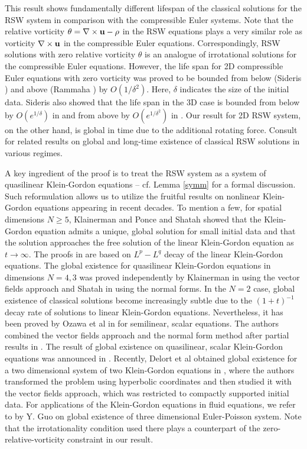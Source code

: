 \documentclass[12pt]{amsart}
\numberwithin{equation}{section} \numberwithin{theorem}{section}
\numberwithin{example}{section} \numberwithin{remark}{section}
\numberwithin{figure}{section} \numberwithin{algorithm}{section}
\def\vu{{\bf u}}
\begin{document}
This result shows fundamentally different lifespan of the classical
solutions for the RSW system in comparison with the compressible
Euler systems. Note that the relative vorticity $\theta=\nabla\times\vu-\rho$ in the RSW
equations plays a very similar role as vorticity $\nabla\times\vu$ in the compressible
Euler equations. Correspondingly, RSW solutions with zero relative
vorticity $\theta$ is an analogue of irrotational solutions for the
compressible Euler equations. However, the life span for 2D
compressible Euler equations with zero vorticity was proved to be
bounded from below (Sideris \cite{Sideris:2D}) and above (Rammaha
\cite{Rammaha}) by $O({1}/{\delta^2})$. Here, $\delta$ indicates the
size of the initial data. Sideris also showed that the life span in
the 3D case is bounded from below by $O(e^{1/\delta})$ in
\cite{Sideris:3D} and from above by $O(e^{1/{\delta^2}})$ in
\cite{Sideris:3D:singularity}. Our result for 2D RSW system, on the other hand, is global in time due to the additional rotating
force. Consult \cite{Babin, LiTa:rotation, ChTa:SIAM} for related results on global and long-time existence of classical RSW solutions in various regimes.

A key ingredient of the proof is to treat the RSW system as a system
of quasilinear Klein-Gordon equations -- cf. Lemma \ref{symm} for a formal
discussion. Such reformulation allows us to utilize the fruitful
results on nonlinear Klein-Gordon equations appearing in recent decades. To
mention a few, for spatial dimensions $N\ge5$, Klainerman and
Ponce \cite{KlainermanP} and Shatah \cite{Shatahev} showed that the
Klein-Gordon equation admits a unique, global solution for small
initial data and that the solution approaches the free solution of
the linear Klein-Gordon equation as $t\rightarrow \infty$. The
proofs in \cite{KlainermanP, Shatahev} are based on $L^p-L^q$ decay
of the linear Klein-Gordon equations. The global existence for  quasilinear Klein-Gordon equations in dimensions $N=4,3$ was proved
independently by Klainerman in \cite{Klainerman} using the vector
fields approach and Shatah in \cite{Shatah} using the normal forms.
In the $N=2$ case, global existence of classical solutions become increasingly subtle due
to the $(1+t)^{-1}$ decay rate of solutions to linear Klein-Gordon equations. Nevertheless, it has been proved by Ozawa et al in
\cite{OzawaSL} for semilinear, scalar equations. The authors combined
the vector fields approach and the normal form method after partial
results in \cite{GeorgievP, Georgiev, Simon}. The result of global existence on
quasilinear, scalar Klein-Gordon equations was announced in
\cite{OzawaQL}. Recently, Delort et al obtained global existence for
a two dimensional system of two Klein-Gordon equations in
\cite{Fang}, where the authors transformed the problem using
hyperbolic coordinates and then studied it with the vector fields
approach, which was restricted to compactly supported initial data.
For applications of the Klein-Gordon equations in fluid equations,
we refer to \cite{Guo} by Y. Guo on global existence of three
dimensional Euler-Poisson system. Note that the irrotationality
condition used there plays a counterpart of the
zero-relative-vorticity constraint in our result.
\end{document}
